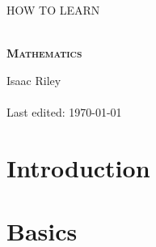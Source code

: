 \documentclass[a4, 12pt]{article}
\begin{document}
\begin{titlepage}


\thispagestyle{fancy}

\vphantom{x}

\vspace{0.5in}

\center


\textsc{\large HOW TO LEARN}

\vspace{0.5in}

\noindent\makebox[\linewidth]{\rule{\linewidth}{1.2pt}}\\
\vspace{2mm}
\textsc{ \textbf{\large Mathematics }}
\noindent\makebox[\linewidth]{\rule{\linewidth}{1.2pt}}

\vspace{2.5in}
Isaac Riley\\~\\

Last edited: \today

\end{titlepage}

\newpage

\setcounter{page}{2}
\tableofcontents
\newpage

\section{Introduction}

\section{Basics}



\end{document}
